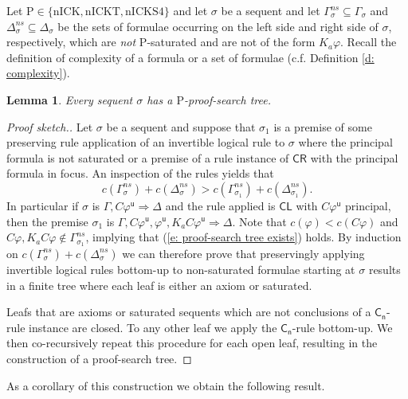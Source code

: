 \documentclass{myifcolog}
\newcommand\C {C}
\newcommand{\K}{K}
\newcommand{\agi}{a}
\renewcommand{\u}{\mathsf{u}}
\newcommand{\hickp}{\mathrm{P}}
\newcommand{\nick}{\mathrm{nICK}}
\newcommand{\nickt}{\mathrm{nICKT}}
\newcommand{\nicks}{\mathrm{nICKS4}}
\newtheorem{lemma}[theorem]{Lemma}
\numberwithin{theorem}{section}
\begin{document}
 
 Let $\hickp \in \{\nick, \nickt, \nicks\}$ and let $\sigma$ be a sequent and let $\Gamma_\sigma^{ns} \subseteq \Gamma_\sigma$ and $\Delta_\sigma^{ns} \subseteq \Delta_\sigma$ be the sets of formulae occurring on the left side and right side of $\sigma$, respectively, which are \emph{not} $\hickp$-saturated and are not of the form $\K_\agi \varphi$. Recall the definition of complexity of a formula or a set of formulae (c.f. Definition \ref{d: complexity}).

\begin{lemma}\label{l: proof-search trees exist}
   Every sequent $\sigma$ has a $\hickp$-proof-search tree. 
\end{lemma}
\begin{proof}[Proof sketch.]
    Let $\sigma$ be a sequent and suppose that $\sigma_1$ is a premise of some preserving rule application of an invertible logical rule to $\sigma$ where the principal formula is not saturated or a premise of a rule instance of $\mathsf{\C R}$ with the principal formula in focus. An inspection of the rules yields that 
    \begin{equation}\label{e: proof-search tree exists}
        c(\Gamma_\sigma^{ns}) + c(\Delta_\sigma^{ns}) > c(\Gamma_{\sigma_1}^{ns}) + c(\Delta_{\sigma_1}^{ns}).
    \end{equation}
    In particular if $\sigma$ is $\Gamma, \C \varphi^\u \Rightarrow \Delta$ and the rule applied is $\mathsf{\C L}$ with $\C \varphi^\u$ principal, then the premise $\sigma_1$ is $\Gamma, \C \varphi^\u, \varphi^\u, \K_\agi \C \varphi^\u \Rightarrow \Delta$. Note that $c(\varphi) < c(\C \varphi)$ and $\C \varphi, \K_\agi \C \varphi \not \in \Gamma_{\sigma_1}^{ns}$, implying that (\ref{e: proof-search tree exists}) holds. By induction on $c(\Gamma_\sigma^{ns}) + c(\Delta_\sigma^{ns})$ we can therefore prove that preservingly applying invertible logical rules bottom-up to non-saturated formulae starting at $\sigma$ results in a finite tree where each leaf is either an axiom or saturated. 
    
    Leafs that are axioms or saturated sequents which are not conclusions of a $\mathsf{C_n}$-rule instance are closed. To any other leaf we apply the $\mathsf{C_n}$-rule bottom-up. We then co-recursively repeat this procedure for each open leaf, resulting in the construction of a proof-search tree.
\end{proof}
 
  As a corollary of this construction we obtain the following result.
  
\end{document}
